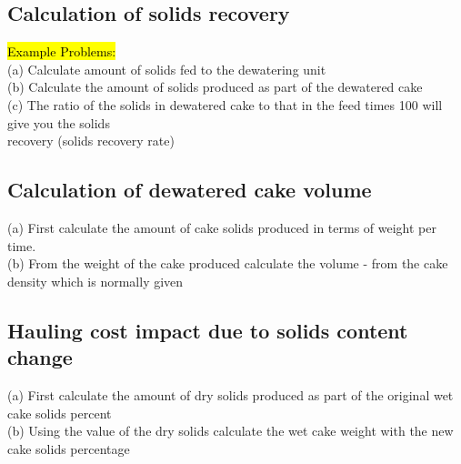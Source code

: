 \subsection{Calculation of solids recovery}



                \hl{Example Problems:}\\


(a) Calculate amount of solids fed to the dewatering unit\\
(b) Calculate the amount of solids produced as part of the dewatered cake\\
(c) The ratio of the solids in dewatered cake to that in the feed times 100 will give you the solids\\
recovery (solids recovery rate)\\


\subsection{Calculation of dewatered cake volume}

(a) First calculate the amount of cake solids produced in terms of weight per time.\\
(b) From the weight of the cake produced calculate the volume - from the cake density which is
normally given\\

\subsection{Hauling cost impact due to solids content change}

(a) First calculate the amount of dry solids produced as part of the original wet cake solids percent\\
(b) Using the value of the dry solids calculate the wet cake weight with the new cake solids percentage\\

